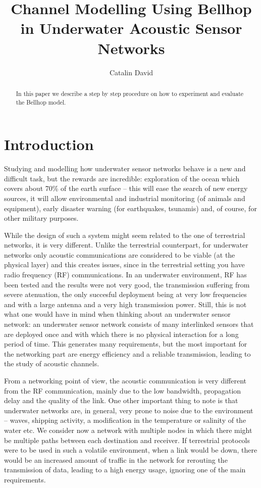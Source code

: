 \documentclass[a4paper]{IEEEtran}
\begin{document}
\author{Catalin David}
\title{Channel Modelling Using Bellhop in Underwater Acoustic Sensor Networks}

\maketitle
\begin{abstract}
In this paper we describe a step by step procedure on how to experiment and
evaluate the Bellhop model.
\end{abstract}

\section{Introduction}
Studying and modelling how underwater sensor networks behave is a new and
difficult task, but the rewards are incredible: exploration of the ocean which
covers about 70\% of the earth surface -- this will ease the search of new
energy sources, it will allow environmental and industrial monitoring (of
animals and equipment), early disaster warning (for earthquakes, tsunamis) and,
of course, for other military purposes.

While the design of such a system might seem related to the one of terrestrial
networks, it is very different. Unlike the terrestrial counterpart, for
underwater networks only acoustic communications are considered to be viable (at
the physical layer) and this creates issues, since in the terrestrial setting
you have radio frequency (RF) communications. In an underwater environment, RF
has been tested and the results were not very good, the transmission suffering
from severe atenuation, the only succesful deployment being at very low
frequencies and with a large antenna and a very high transmission power. Still,
this is not what one would have in mind when thinking about an underwater sensor
network: an underwater sensor network consists of many interlinked sensors that
are deployed once and with which there is no physical interaction for a long
period of time. This generates many requirements, but the most important for the
networking part are energy efficiency and a reliable transmission, leading to
the study of acoustic channels.

From a networking point of view, the acoustic communication is very different
from the RF communication, mainly due to the low bandwidth, propagation delay
and the quality of the link. One other important thing to note is that
underwater networks are, in general, very prone to noise due to the environment
-- waves, shipping activity, a modification in the temperature or salinity of
the water etc. We consider now a network with multiple nodes in which there
might be multiple paths between each destination and receiver. If terrestrial
protocols were to be used in such a volatile environment, when a link would be
down, there would be an increased amount of traffic in the network for rerouting
the transmission of data, leading to a high energy usage, ignoring one of the
main requirements.
\end{document}

